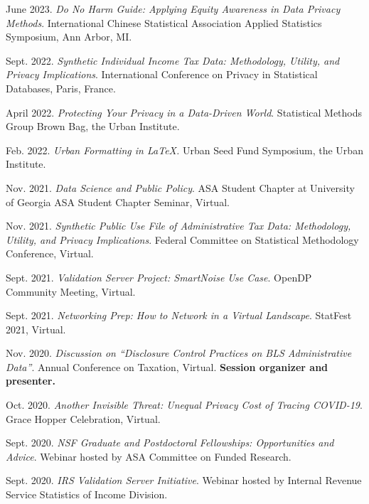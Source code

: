 \begin{etaremune}[topsep=0pt, itemsep=4pt, partopsep=0pt, parsep=0pt]
    \item June 2023. \textit{Do No Harm Guide: Applying Equity Awareness in Data Privacy Methods}. International Chinese Statistical Association Applied Statistics Symposium, Ann Arbor, MI.
    
    \item Sept. 2022. \textit{Synthetic Individual Income Tax Data: Methodology, Utility, and Privacy Implications}. International Conference on Privacy in Statistical Databases, Paris, France.
    
    \item April 2022. \textit{Protecting Your Privacy in a Data-Driven World}. Statistical Methods Group Brown Bag, the Urban Institute.
    
    \item Feb. 2022. \textit{Urban Formatting in LaTeX.} Urban Seed Fund Symposium, the Urban Institute.

    \item Nov. 2021. \textit{Data Science and Public Policy}. ASA Student Chapter at University of Georgia ASA Student Chapter Seminar, Virtual.
    
    \item Nov. 2021. \textit{Synthetic Public Use File of Administrative Tax Data: Methodology, Utility, and Privacy Implications}. Federal Committee on Statistical Methodology Conference, Virtual.
    
    \item Sept. 2021. \textit{Validation Server Project: SmartNoise Use Case}. OpenDP Community Meeting, Virtual.
    
    \item Sept. 2021. \textit{Networking Prep: How to Network in a Virtual Landscape}. StatFest 2021, Virtual.
    
    \item Nov. 2020. \textit{Discussion on ``Disclosure Control Practices on BLS Administrative Data''}. Annual Conference on Taxation, Virtual. \textbf{Session organizer and presenter.}
    
    \item Oct. 2020. \textit{Another Invisible Threat: Unequal Privacy Cost of Tracing COVID-19}. Grace Hopper Celebration, Virtual.
    
    \item Sept. 2020. \textit{NSF Graduate and Postdoctoral Fellowships: Opportunities and Advice}. Webinar hosted by ASA Committee on Funded Research.
    
    \item Sept. 2020. \textit{IRS Validation Server Initiative}. Webinar hosted by Internal Revenue Service Statistics of Income Division.
    

\end{etaremune}
